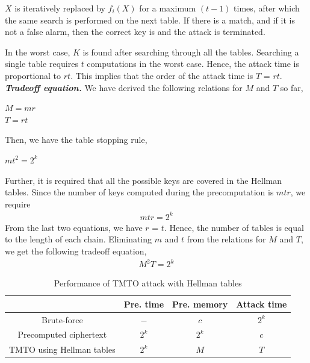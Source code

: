 $X$ is iteratively replaced by $f_i(X)$ for a maximum $(t-1)$ times, after which the same search is performed on the next table. If there is a match, and if it is not a false alarm, then the correct key is and the attack is terminated. 

In the worst case, $K$ is found after searching through all the tables. Searching a single table requires $t$ computations in the worst case. Hence, the attack time is proportional to $rt$. This implies that the order of the attack time is $T$ = $rt$.\\

\noindent \textit{\textbf{Tradeoff equation.}} We have derived the following relations for $M$ and $T$ so far, 
\begin{center}
$M = mr$\\
$T = rt$\\
\end{center}
Then, we have the table stopping rule,
\begin{center}
$mt^2 = 2^k$\\
\end{center}
Further, it is required that all the possible keys are covered in the Hellman tables. Since the number of keys computed during the precomputation is $mtr$, we require
\begin{align*}
mtr = 2^k
\end{align*}
From the last two equations, we have $r$ = $t$. Hence, the number of tables is equal to the length of each chain. Eliminating $m$ and $t$ from the relations for $M$ and $T$, we get the following tradeoff equation,
\begin{align}
\label{eq:hellman-block} M^{2}T = 2^k
\end{align}

\begin{table}[ht!]
\begin{center}
\begin{tabular}{c|c|c|c}
													&		Pre. time		& Pre. memory	& Attack time		 \\ \hline
Brute-force 							&		$-$		& $c$	 	& $2^k$		\\ \hline
Precomputed ciphertext		&		$2^k$	& $2^k$	& $c$		 	\\ \hline
TMTO using Hellman tables	&		$2^k$	& $M$ & $T$ 			\\
\end{tabular}
\end{center}
\caption{Performance of TMTO attack with Hellman tables}
\label{tab:hellman-tmto-comparison}
\end{table}


